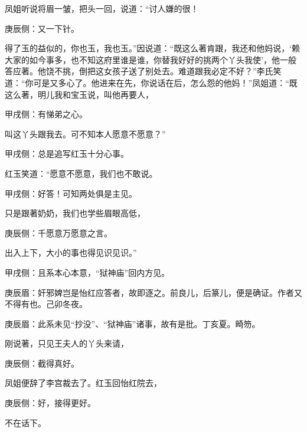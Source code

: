 \begin{parag}
    凤姐听说将眉一皱，把头一回，说道：“讨人嫌的很！\begin{note}庚辰侧：又一下针。\end{note}得了玉的益似的，你也玉，我也玉。”因说道：“既这么著肯跟，我还和他妈说，‘赖大家的如今事多，也不知这府里谁是谁，你替我好好的挑两个丫头我使’，他一般答应著。他饶不挑，倒把这女孩子送了别处去。难道跟我必定不好？”李氏笑道：“你可是又多心了。他进来在先，你说话在后，怎么怨的他妈！”凤姐道：“既这么著，明儿我和宝玉说，叫他再要人，\begin{note}甲戌侧：有悌弟之心。\end{note}叫这丫头跟我去。可不知本人愿意不愿意？”\begin{note}甲戌侧：总是追写红玉十分心事。\end{note}红玉笑道：“愿意不愿意，我们也不敢说。\begin{note}甲戌侧：好答！可知两处俱是主见。\end{note}只是跟著奶奶，我们也学些眉眼高低，\begin{note}庚辰侧：千愿意万愿意之言。\end{note}出入上下，大小的事也得见识见识。”\begin{note}甲戌侧：且系本心本意，“狱神庙”回内方见。\end{note}\begin{note}庚辰眉：奸邪婢岂是怡红应答者，故即逐之。前良儿，后篆儿，便是确证。作者又不得有也。己卯冬夜。\end{note}\begin{note}庚辰眉：此系未见“抄没”、“狱神庙”诸事，故有是批。丁亥夏。畸笏。\end{note}刚说著，只见王夫人的丫头来请，\begin{note}庚辰侧：截得真好。\end{note}凤姐便辞了李宫裁去了。红玉回怡红院去，\begin{note}庚辰侧：好，接得更好。\end{note}不在话下。
\end{parag}


